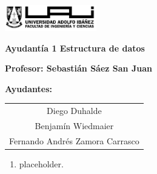 \documentclass[12pt]{article}
\begin{document}
    \begin{titlepage}
        \centering
        \includegraphics[width=0.3\textwidth]{../imgs/logo-uai-fic.png}
        
        \vspace{0.5cm}
        \textbf{\fontsize{12}{24} Ayudantía 1 Estructura de datos}
        
        \vspace{0.5cm}
        \textbf{\fontsize{12}{24}\selectfont Profesor: Sebastián Sáez San Juan}
        
        \begin{center}
            \textbf{\fontsize{12}{24}\selectfont Ayudantes:}
        \end{center}
        \vspace{-0.8cm}
        \begin{center}
            \renewcommand{\arraystretch}{1.5}
            \begin{tabular}{c}
                Diego Duhalde \\ 
                Benjamín Wiedmaier \\ 
                Fernando Andrés Zamora Carrasco
            \end{tabular}
        \end{center}
        \vspace{0cm}

        \begin{enumerate}
            \item placeholder.
        \end{enumerate}
    \end{titlepage}
\end{document}
